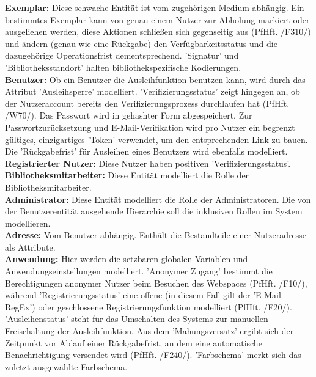 \documentclass{article}
\begin{document}
\textbf{Exemplar:} Diese schwache Entität ist vom zugehörigen Medium abhängig. Ein bestimmtes Exemplar kann von genau einem Nutzer zur Abholung markiert oder ausgeliehen werden, diese Aktionen schließen sich gegenseitig aus (PfHft. /F310/) und ändern (genau wie eine Rückgabe) den Verfügbarkeitsstatus und die dazugehörige Operationsfrist dementsprechend. 'Signatur' und 'Bibliotheksstandort' halten bibliothekspezifische Kodierungen. \\
\textbf{Benutzer:} Ob ein Benutzer die Ausleihfunktion benutzen kann, wird durch das Attribut 'Ausleihsperre' modelliert. 'Verifizierungsstatus' zeigt hingegen an, ob der Nutzeraccount bereits den Verifizierungsprozess durchlaufen hat (PfHft. /W70/). Das Passwort wird in gehashter Form abgespeichert. Zur Passwortzurücksetzung und E-Mail-Verifikation wird pro Nutzer ein begrenzt gültiges, einzigartiges 'Token' verwendet, um den entsprechenden Link zu bauen. Die 'Rückgabefrist' für Ausleihen eines Benutzers wird ebenfalls modelliert.\\
\textbf{Registrierter Nutzer:} Diese Nutzer haben positiven 'Verifizierungsstatus'.\\
\textbf{Bibliotheksmitarbeiter:} Diese Entität modelliert die Rolle der Bibliotheksmitarbeiter.\\
\textbf{Administrator:} Diese Entität modelliert die Rolle der Administratoren. Die von der Benutzerentität ausgehende Hierarchie soll die inklusiven Rollen im System modellieren.  \\
\textbf{Adresse:} Vom Benutzer abhängig. Enthält die Bestandteile einer Nutzeradresse als Attribute. \\
\textbf{Anwendung:} Hier werden die setzbaren globalen Variablen und Anwendungseinstellungen modelliert. 'Anonymer Zugang' bestimmt die Berechtigungen anonymer Nutzer beim Besuchen des Webspaces (PfHft. /F10/), während 'Registrierungsstatus' eine offene (in diesem Fall gilt der 'E-Mail RegEx') oder geschlossene Registrierungsfunktion modelliert (PfHft. /F20/). 'Ausleihenstatus' steht für das Umschalten des Systems zur manuellen Freischaltung der Ausleihfunktion. Aus dem 'Mahungsversatz' ergibt sich der Zeitpunkt vor Ablauf einer Rückgabefrist, an dem eine automatische Benachrichtigung versendet wird (PfHft. /F240/). \hypertarget{Farbschemaattribut}{'Farbschema'} merkt sich das zuletzt ausgewählte Farbschema. \\

\end{document}
